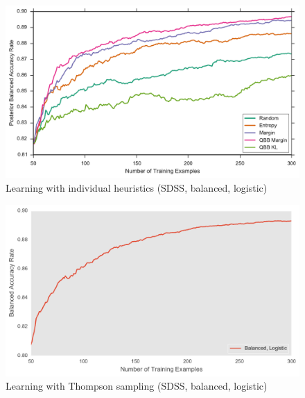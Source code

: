 \begin{figure}[p]
	\centering
	\includegraphics[width=\textwidth]{figures/5_active/sdss_ul_individuals}
	\caption[Learning with individual heuristics (SDSS, unbalanced, logistic)]{
		Learning with individual heuristics (SDSS, balanced, logistic)}
	\label{fig:sdss_ul_individuals}
\end{figure}

\begin{figure}[p]
	\centering
	\includegraphics[width=\textwidth]{figures/5_thompson/sdss_ul_thompson}
	\caption[Learning with Thompson sampling (SDSS, unbalanced, logistic)]{
		Learning with Thompson sampling (SDSS, balanced, logistic)}
	\label{fig:sdss_ul_thompson}
\end{figure}

